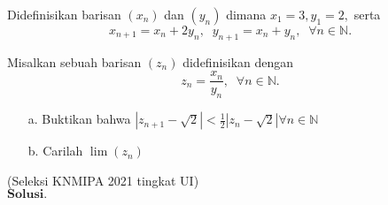 \documentclass{article}
\theoremstyle{indented}
\begin{document}
	Didefinisikan barisan $(x_n)$ dan $(y_n)$ dimana $x_1 = 3, y_1 = 2,$ serta $$x_{n+1}=x_n+2y_n, \; \; y_{n+1}=x_n+y_n, \; \; \forall n \in \mathbb{N}.$$
	
	Misalkan sebuah barisan $(z_n)$ didefinisikan dengan $$z_n = \frac{x_n}{y_n}, \; \; \forall n \in \mathbb{N}.$$
	
	\begin{enumerate}
		\item[ a.] Buktikan bahwa $|z_{n+1}-\sqrt{2}| < \frac12|z_n - \sqrt{2}| \forall n \in \mathbb{N}$
		\item[ b.] Carilah $\lim (z_n)$
	\end{enumerate}

	(Seleksi KNMIPA 2021 tingkat UI)\\
	\newpage
	$\textbf{Solusi. }$
	
\end{document}
